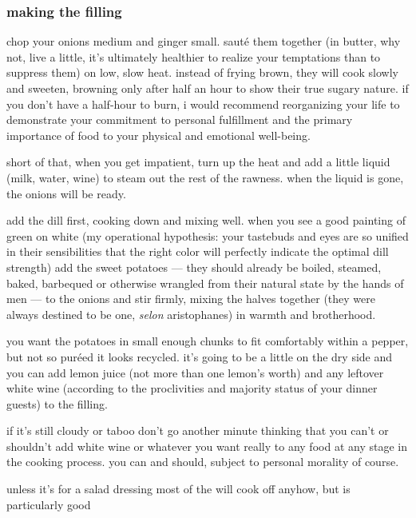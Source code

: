 \subsubsection{making the filling}

chop your onions medium and ginger small. saut\'{e} them together (in butter, 
why not, live a little, it's ultimately healthier to realize your temptations 
than to suppress them) on low, slow heat. instead of frying brown, they will 
cook slowly and sweeten, browning only after half an hour to show their true 
sugary nature. if you don't have a half-hour to burn, i would recommend 
reorganizing your life to demonstrate your commitment to personal fulfillment 
and the primary importance of food to your physical and emotional well-being.

short of that, when you get impatient, turn up the heat and add a little 
liquid (milk, water, wine) to steam out the rest of the rawness. when the 
liquid is gone, the onions will be ready.

add the dill first, cooking down and mixing well. when you see a good painting 
of green on white (my operational hypothesis: your tastebuds and eyes are so 
unified in their  sensibilities that the right color  will 
perfectly indicate the optimal dill strength) add the sweet potatoes --- they 
should already be boiled, steamed, baked, barbequed or otherwise wrangled from 
their natural state by the hands of men --- to the onions and stir firmly, 
mixing the halves together (they were always destined to be one, 
\textit{selon} aristophanes) in warmth and brotherhood.

you want the potatoes in small enough chunks to fit comfortably within a 
pepper, but not so pur\'{e}ed it looks recycled. it's going to be a little on 
the dry side and you can add lemon juice (not more than one lemon's worth) and 
any leftover white wine (according to the proclivities and majority status of 
your dinner guests) to the filling.

if it's still cloudy or taboo don't go another minute thinking that you can't 
or shouldn't add white wine or whatever  you want really to any food at 
any stage in the cooking process. you can and should, subject to personal 
morality of course.

unless it's for a salad dressing most of the  will cook off anyhow, but 
 is particularly good

